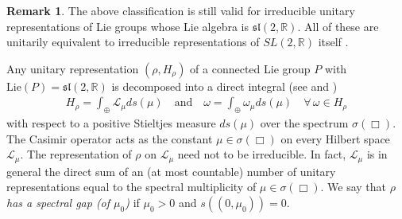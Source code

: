 \documentclass[11 pt]{amsart}
\newcommand{\RR}{\mathbb{R}}
\theoremstyle{definition}
\newtheorem{remark}[theorem]{Remark}
\numberwithin{equation}{section}
\begin{document}
\begin{remark}\label{re:4}The above classification is  still valid for irreducible unitary representations of Lie groups whose
Lie algebra is $\mathfrak{sl}(2,\RR)$. All of these are unitarily equivalent to
irreducible representations of $SL(2,\RR)$ itself \cite{tan}.
\end{remark}










Any unitary representation $(\rho,H_\rho)$ of a connected Lie group $P$ with $\text{Lie}(P)=\mathfrak{sl}(2,\RR)$ is decomposed into a direct integral (see \cite{Forni} and \cite{mautner1950unitary})
\begin{align*}
H_\rho=\int_{\oplus}\mathcal{L}_\mu ds(\mu)\quad\text{and}\quad \omega=\int_{\oplus}\omega_\mu ds(\mu) \quad \forall\,\omega\in H_\rho
\end{align*}
with respect to a positive Stieltjes measure $ds(\mu)$ over the spectrum $\sigma(\Box)$. The
Casimir operator acts as the constant $\mu\in \sigma(\Box)$ on every Hilbert space $\mathcal{L}_\mu$. The
representation of $\rho$ on $\mathcal{L}_\mu$  need not to be irreducible. In fact, $\mathcal{L}_\mu$ is in general
the direct sum of an (at most countable) number of unitary representations equal
to the spectral multiplicity of $\mu\in \sigma(\Box)$. We say that \emph{$\rho$ has a spectral gap (of $\mu_0$)} if $\mu_0>0$ and $s((0,\mu_0))=0$.
\end{document}
